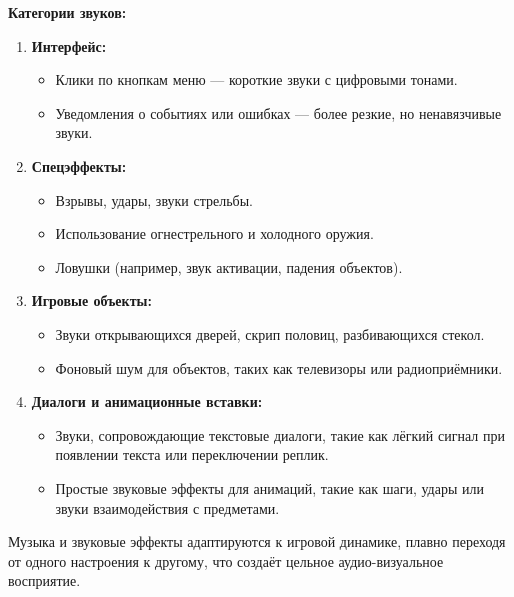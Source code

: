 \documentclass[12pt]{article}
\begin{document}
        \textbf{Категории звуков:}
        \begin{enumerate}
            \item \textbf{Интерфейс:}
            \begin{itemize}
                \item Клики по кнопкам меню — короткие звуки с цифровыми тонами.
                \item Уведомления о событиях или ошибках — более резкие, но ненавязчивые звуки.
            \end{itemize}
    
            \item \textbf{Спецэффекты:}
            \begin{itemize}
                \item Взрывы, удары, звуки стрельбы.
                \item Использование огнестрельного и холодного оружия.
                \item Ловушки (например, звук активации, падения объектов).
            \end{itemize}
    
            \item \textbf{Игровые объекты:}
            \begin{itemize}
                \item Звуки открывающихся дверей, скрип половиц, разбивающихся стекол.
                \item Фоновый шум для объектов, таких как телевизоры или радиоприёмники.
            \end{itemize}
    
            \item \textbf{Диалоги и анимационные вставки:}
            \begin{itemize}
                \item Звуки, сопровождающие текстовые диалоги, такие как лёгкий сигнал при появлении текста или переключении реплик.
                \item Простые звуковые эффекты для анимаций, такие как шаги, удары или звуки взаимодействия с предметами.
            \end{itemize}
        \end{enumerate}
    
        Музыка и звуковые эффекты адаптируются к игровой динамике, плавно переходя от одного настроения к другому, что создаёт цельное аудио-визуальное восприятие.
\end{document}
